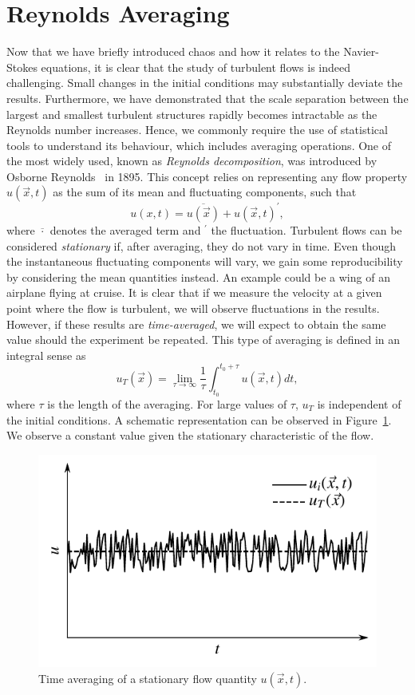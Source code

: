 \section{Reynolds Averaging}
Now that we have briefly introduced chaos and how it relates to the Navier-Stokes equations, it is clear that the study of turbulent flows is indeed challenging. Small changes in the initial conditions may substantially deviate the results. Furthermore, we have demonstrated that the scale separation between the largest and smallest turbulent structures rapidly becomes intractable as the Reynolds number increases. Hence, we commonly require the use of statistical tools to understand its behaviour, which includes averaging operations. One of the most widely used, known as \textit{Reynolds decomposition}, was introduced by Osborne Reynolds~\cite{reynoldsIVDynamicalTheory1895} in 1895. This concept relies on representing any flow property $u(\vec{x},t)$ as the sum of its mean and fluctuating components, such that
\begin{equation}
	u(x,t) = \overline{u(\vec{x})} + u(\vec{x},t)^\prime,
	\label{eq:reynolds_decomp}
\end{equation}
where $\overline{\cdot}$ denotes the averaged term and $^\prime$ the fluctuation.
Turbulent flows can be considered \textit{stationary} if, after averaging, they do not vary in time. Even though the instantaneous fluctuating components will vary, we gain some reproducibility by considering the mean quantities instead. An example could be a wing of an airplane flying at cruise. It is clear that if we measure the velocity at a given point where the flow is turbulent, we will observe fluctuations in the results. However, if these results are \textit{time-averaged}, we will expect to obtain the same value should the experiment be repeated. This type of averaging is defined in an integral sense as
\begin{equation}
	u_T(\vec{x}) = \lim_{\tau\rightarrow\infty} \frac{1}{\tau} \int_{t_0}^{t_0+\tau} u(\vec{x},t)dt,
	\label{eq:time_averaging}
\end{equation}
where $\tau$ is the length of the averaging. For large values of $\tau$, $u_T$ is independent of the initial conditions. A schematic representation can be observed in Figure~\ref{fig:time_averaging}. We observe a constant value given the stationary characteristic of the flow.
\begin{figure}[htbp]
	\centering
	\includegraphics[width=0.6\linewidth]{Pictures/time_averaging}
	\caption{Time averaging of a stationary flow quantity $u(\vec{x},t).$}
	\label{fig:time_averaging}
\end{figure}

